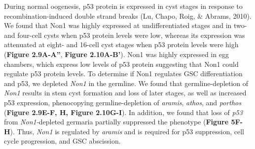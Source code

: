 \documentclass[12pt,oneside]{reedthesis}
\begin{document}
During normal oogenesis, p53 protein is expressed in cyst stages in response to recombination-induced double strand breaks (Lu, Chapo, Roig, \& Abrams, 2010). We found that Non1 was highly expressed at undifferentiated stages and in two- and four-cell cysts when p53 protein levels were low, whereas its expression was attenuated at eight- and 16-cell cyst stages when p53 protein levels were high (\textbf{Figure 2.9A-A''}, \textbf{Figure 2.10A-B'}). Non1 was highly expressed in egg chambers, which express low levels of p53 protein suggesting that Non1 could regulate p53 protein levels. To determine if Non1 regulates GSC differentiation and p53, we depleted \emph{Non1} in the germline. We found that germline-depletion of \emph{Non1} results in stem cyst formation and loss of later stages, as well as increased p53 expression, phenocopying germline-depletion of \emph{aramis}, \emph{athos}, and \emph{porthos} (\textbf{Figure 2.9E-F, H, Figure 2.10G-I}). In addition, we found that loss of \emph{p53} from \emph{Non1-}depleted germaria partially suppressed the phenotype (\textbf{Figure 5F-H}). Thus, \emph{Non1} is regulated by \emph{aramis} and is required for p53 suppression, cell cycle progression, and GSC abscission.
\end{document}
